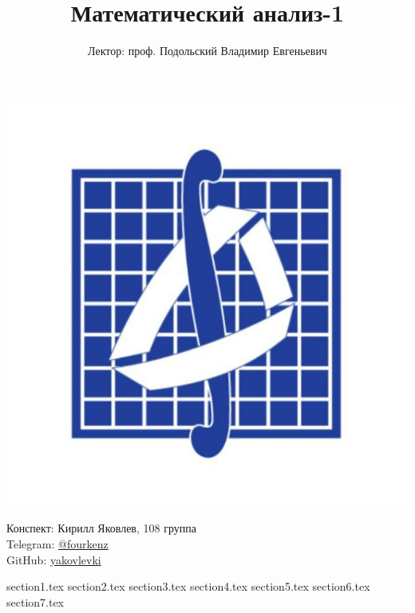 \documentclass[a4paper, 12pt]{article}
\title{\textbf{Математический анализ-1}}
\author{Лектор: проф. Подольский Владимир Евгеньевич}
\theoremstyle{definition}
\begin{document}
    
\fontsize{14pt}{20pt}\selectfont
\maketitle
\vspace{0.3cm}
\begin{center}
    \includegraphics[width=0.75\linewidth]{Pictures/mehmat.png}
\end{center}
\vspace{1.5cm}
\begin{center}
    Конспект: Кирилл Яковлев, 108 группа\\
    Telegram: \href{https://t.me/fourkenz}{@fourkenz}\\
    GitHub: \href{https://github.com/yakovlevki}{yakovlevki}\\
\end{center}
    
\newpage
\tableofcontents
\fontsize{14pt}{20pt}\selectfont
\newpage

{section1.tex}
{section2.tex}
{section3.tex}
{section4.tex}
{section5.tex}
{section6.tex}
{section7.tex}
    
\end{document}
